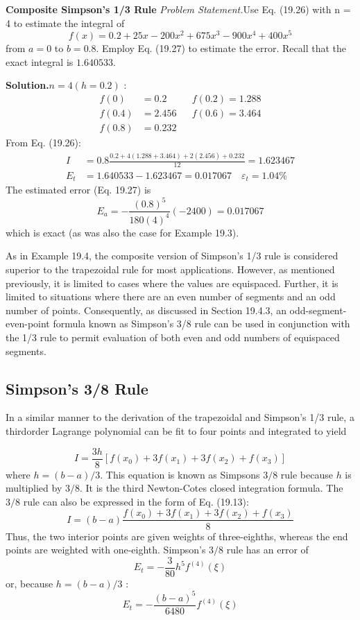 \documentclass[../main.tex]{subfiles}
\begin{document}
		\begin{exmp} \textbf{Composite Simpson's 1/3 Rule}
			\noindent\textit{Problem Statement.}Use Eq. (19.26) with n = 4 to estimate the integral of
			$$
f(x)=0.2+25 x-200 x^{2}+675 x^{3}-900 x^{4}+400 x^{5}
$$
from $a=0$ to $b=0.8$. Employ Eq. (19.27) to estimate the error. Recall that the exact integral is $1.640533$.

			\noindent \textbf{Solution.}$n=4(h=0.2)$ :
			$$
			\begin{aligned}
			f(0) &=0.2 & & f(0.2)=1.288 \\
			f(0.4) &=2.456 & & f(0.6)=3.464 \\
			f(0.8) &=0.232 & &
			\end{aligned}
			$$
			From Eq. (19.26):
			$$
			\begin{aligned}
			I &=0.8 \frac{0.2+4(1.288+3.464)+2(2.456)+0.232}{12}=1.623467 \\
			E_{t} &=1.640533-1.623467=0.017067 \quad \varepsilon_{t}=1.04 \%
			\end{aligned}
			$$
			The estimated error (Eq. 19.27) is
			$$
			E_{a}=-\frac{(0.8)^{5}}{180(4)^{4}}(-2400)=0.017067
			$$
			which is exact (as was also the case for Example 19.3).
		\end{exmp}
		As in Example 19.4, the composite version of Simpson's 1/3 rule is considered superior to the trapezoidal rule for most applications. However, as mentioned previously, it is
		limited to cases where the values are equispaced. Further, it is limited to situations where
		there are an even number of segments and an odd number of points. Consequently, as discussed in Section 19.4.3, an odd-segment-even-point formula known as Simpson's 3/8
		rule can be used in conjunction with the 1/3 rule to permit evaluation of both even and odd
		numbers of equispaced segments.

		\subsection{ Simpson's 3/8 Rule}

		In a similar manner to the derivation of the trapezoidal and Simpson’s 1/3 rule, a thirdorder Lagrange polynomial can be fit to four points and integrated to yield

		$$
I=\frac{3 h}{8}\left[f\left(x_{0}\right)+3 f\left(x_{1}\right)+3 f\left(x_{2}\right)+f\left(x_{3}\right)\right]
$$
where $h=(b-a) / 3$. This equation is known as Simpsons $3 / 8$ rule because $h$ is multiplied by $3 / 8$. It is the third Newton-Cotes closed integration formula. The $3 / 8$ rule can also be expressed in the form of Eq. (19.13):
\begin{equation}
    \tag{19.28}
I=(b-a) \frac{f\left(x_{0}\right)+3 f\left(x_{1}\right)+3 f\left(x_{2}\right)+f\left(x_{3}\right)}{8}
\end{equation}
Thus, the two interior points are given weights of three-eighths, whereas the end points are weighted with one-eighth. Simpson's $3 / 8$ rule has an error of
$$
E_{t}=-\frac{3}{80} h^{5} f^{(4)}(\xi)
$$
or, because $h=(b-a) / 3$ :
\begin{equation}
    \tag{19.29}
E_{t}=-\frac{(b-a)^{5}}{6480} f^{(4)}(\xi)
\end{equation}
\end{document}
